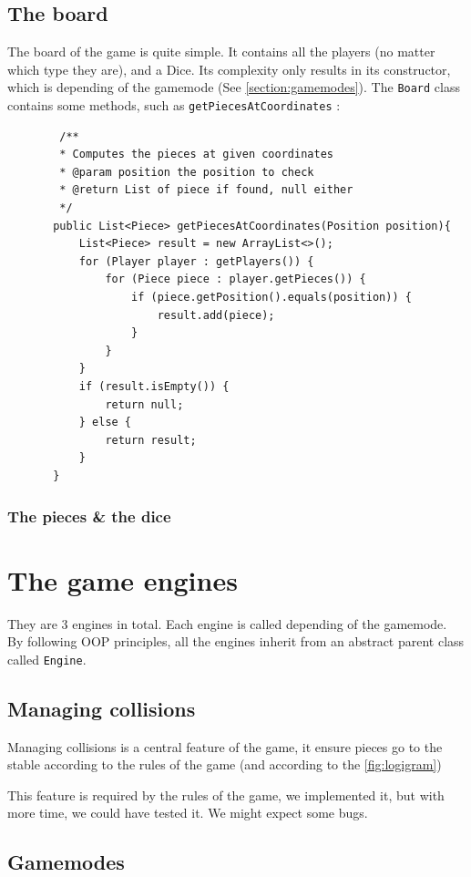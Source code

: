 \documentclass[english, 11pt, titlepage]{article}
\begin{document}
    \subsection{The board}
    The board of the game is quite simple. It contains all the players (no matter which type they are), and a Dice. Its complexity only results in its constructor, which is depending of the gamemode (See \autoref{section:gamemodes}). The \verb|Board| class contains some methods, such as \verb|getPiecesAtCoordinates| :
    \begin{lstlisting}
        /**
        * Computes the pieces at given coordinates
        * @param position the position to check
        * @return List of piece if found, null either
        */
       public List<Piece> getPiecesAtCoordinates(Position position){
           List<Piece> result = new ArrayList<>();
           for (Player player : getPlayers()) {
               for (Piece piece : player.getPieces()) {
                   if (piece.getPosition().equals(position)) {
                       result.add(piece);
                   }
               }
           }
           if (result.isEmpty()) {
               return null;
           } else {
               return result;
           }
       }   
    \end{lstlisting}
    \subsubsection{The pieces \& the dice}

    \section{The game engines}
    They are 3 engines in total. Each engine is called depending of the gamemode. By following OOP principles, all the engines inherit from an abstract parent class called \verb|Engine|.
    \subsection{Managing collisions}
    Managing collisions is a central feature of the game, it ensure pieces go to the stable according to the rules of the game (and according to the \autoref{fig:logigram})
    
    This feature is required by the rules of the game, we implemented it, but with more time, we could have tested it. We might expect some bugs.

    \subsection{Gamemodes}
    \label{section:gamemodes}
\end{document}
